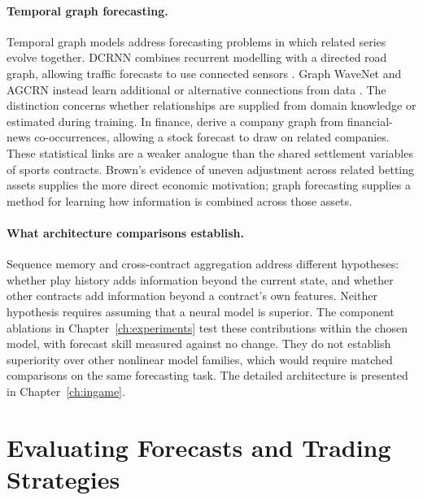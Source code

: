 \documentclass[12pt,a4paper,oneside]{report}
\begin{document}
\paragraph{Temporal graph forecasting.}
Temporal graph models address forecasting problems in which related series
evolve together. DCRNN combines recurrent modelling with a directed road graph,
allowing traffic forecasts to use connected sensors \citep{li2018diffusion}.
Graph WaveNet and AGCRN instead learn additional or alternative connections
from data \citep{wu2019graph,bai2020adaptive}. The distinction concerns whether
relationships are supplied from domain knowledge or estimated during training.
In finance, \citet{luo2024spatial} derive a company graph from financial-news
co-occurrences, allowing a stock forecast to draw on related companies. These
statistical links are a weaker analogue than the shared settlement variables of
sports contracts. Brown's evidence of uneven adjustment across related betting
assets supplies the more direct economic motivation; graph forecasting supplies
a method for learning how information is combined across those assets.

\paragraph{What architecture comparisons establish.}
Sequence memory and cross-contract aggregation address different hypotheses:
whether play history adds information beyond the current state, and whether
other contracts add information beyond a contract's own features. Neither
hypothesis requires assuming that a neural model is superior. The component
ablations in Chapter~\ref{ch:experiments} test these contributions within the
chosen model, with forecast skill measured against no change. They do not
establish superiority over other nonlinear model families, which would require
matched comparisons on the same forecasting task. The detailed
architecture is presented in Chapter~\ref{ch:ingame}.

\section{Evaluating Forecasts and Trading Strategies}
\end{document}

